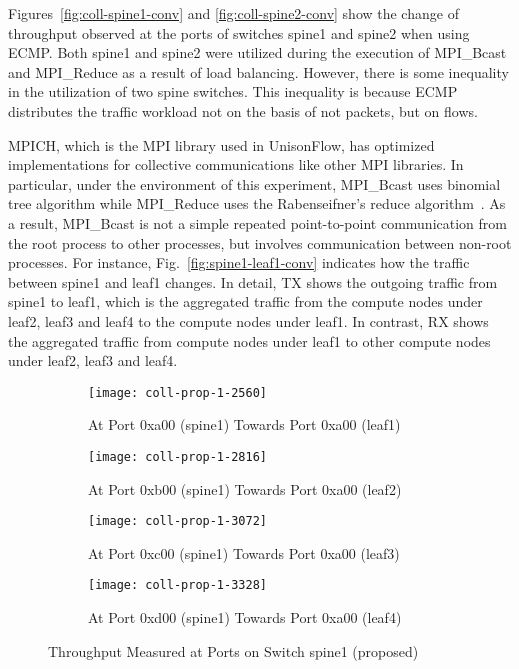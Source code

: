 Figures~\ref{fig:coll-spine1-conv} and \ref{fig:coll-spine2-conv} show
the change of throughput observed at the ports of switches spine1 and
spine2 when using ECMP\@. Both spine1 and spine2 were utilized during the
execution of MPI\_Bcast and MPI\_Reduce as a result of load balancing.
However, there is some inequality in the utilization of two spine
switches. This inequality is because ECMP distributes the traffic
workload not on the basis of not packets, but on flows.

MPICH, which is the MPI library used in UnisonFlow, has optimized
implementations for collective communications like other MPI libraries.
In particular, under the environment of this experiment, MPI\_Bcast uses
binomial tree algorithm while MPI\_Reduce uses the Rabenseifner's reduce
algorithm~\autocite{Rabenseifner2004}. As a result, MPI\_Bcast is not a
simple repeated point-to-point communication from the root process to
other processes, but involves communication between non-root processes.
For instance, Fig.~\ref{fig:spine1-leaf1-conv} indicates how the traffic
between spine1 and leaf1 changes. In detail, TX shows the outgoing
traffic from spine1 to leaf1, which is the aggregated traffic from the
compute nodes under leaf2, leaf3 and leaf4 to the compute nodes
under leaf1. In contrast, RX shows the aggregated traffic from compute
nodes under leaf1 to other compute nodes under leaf2, leaf3 and leaf4.

\begin{figure}
    \centering
    \begin{subfigure}{.45\linewidth}
        \texttt{[image: coll-prop-1-2560]}
        \caption{At Port 0xa00 (spine1) \newline Towards Port 0xa00 (leaf1)}%
        \label{fig:spine1-leaf1-prop}
    \end{subfigure}
    \begin{subfigure}{.45\linewidth}
        \texttt{[image: coll-prop-1-2816]}
        \caption{At Port 0xb00 (spine1) \newline Towards Port 0xa00 (leaf2)}%
        \label{fig:spine1-leaf2-prop}
    \end{subfigure}
    \begin{subfigure}{.45\linewidth}
        \texttt{[image: coll-prop-1-3072]}
        \caption{At Port 0xc00 (spine1) \newline Towards Port 0xa00 (leaf3)}%
        \label{fig:spine1-leaf3-prop}
    \end{subfigure}
    \begin{subfigure}{.45\linewidth}
        \texttt{[image: coll-prop-1-3328]}
        \caption{At Port 0xd00 (spine1) \newline Towards Port 0xa00 (leaf4)}%
        \label{fig:spine1-leaf4-prop}
    \end{subfigure}
    \caption{Throughput Measured at Ports on Switch spine1 (proposed)}%
    \label{fig:coll-spine1-prop}
\end{figure}

